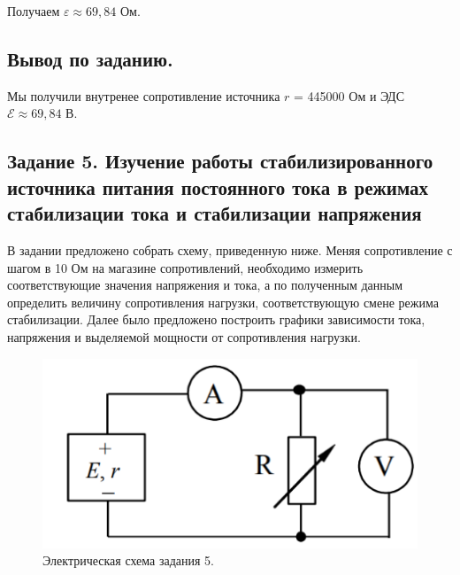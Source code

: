 \documentclass[a4paper,12pt]{article}
\begin{document}
Получаем $\varepsilon \approx 69,84$ Ом.

\subsection{Вывод по заданию.}
\hspace{\parindent}Мы получили внутренее сопротивление источника $r$ = 445000 Ом и ЭДС $\mathcal{E}\approx 69,84$ В.

\subsection{Задание 5. Изучение работы стабилизированного
источника питания постоянного тока в режимах
стабилизации тока и стабилизации напряжения}

В задании предложено собрать схему, приведенную ниже. Меняя
сопротивление с шагом в 10 Ом на магазине сопротивлений, необходимо измерить
соответствующие значения напряжения и тока, а по полученным данным определить
величину сопротивления нагрузки, соответствующую смене режима стабилизации. Далее
было предложено построить графики зависимости тока, напряжения и выделяемой
мощности от сопротивления нагрузки.

\begin{figure}[h!]
	\begin{center}
		\includegraphics[scale=0.8]{scheme_5.png}
	\end{center}
	\caption{Электрическая схема задания 5.}
\end{figure}
\end{document}
